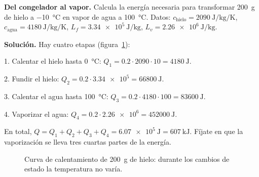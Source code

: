 \begin{example}
    \textbf{Del congelador al vapor.} Calcula la energía necesaria para transformar \qty{200}{\g} de hielo a \qty{-10}{\degreeCelsius}
    en vapor de agua a \qty{100}{\degreeCelsius}. Datos: \(c_{\text{hielo}} = \qty{2090}{\joule\per\kg\per\kelvin}\),
    \(c_{\text{agua}} = \qty{4180}{\joule\per\kg\per\kelvin}\), \(L_f = \qty{3.34e5}{\joule\per\kg}\), \(L_v = \qty{2.26e6}{\joule\per\kg}\).

    \textbf{Solución.} Hay cuatro etapas (figura~\ref{fig:ud13-calentamiento}):

    1. Calentar el hielo hasta \qty{0}{\degreeCelsius}: \(Q_1 = \num{0.2} \cdot 2090 \cdot 10 = \qty{4180}{\joule}\).

    2. Fundir el hielo: \(Q_2 = \num{0.2} \cdot \num{3.34e5} = \qty{66800}{\joule}\).

    3. Calentar el agua hasta \qty{100}{\degreeCelsius}: \(Q_3 = \num{0.2} \cdot 4180 \cdot 100 = \qty{83600}{\joule}\).

    4. Vaporizar el agua: \(Q_4 = \num{0.2} \cdot \num{2.26e6} = \qty{452000}{\joule}\).

    En total, \(Q = Q_1 + Q_2 + Q_3 + Q_4 = \qty{6.07e5}{\joule} = \qty{607}{\kilo\joule}\). Fíjate en que la vaporización se lleva
    tres cuartas partes de la energía.
\end{example}

\begin{figure}[H]
    \centering
    \caption{Curva de calentamiento de \qty{200}{\g} de hielo: durante los cambios de estado la temperatura no varía.}
    \label{fig:ud13-calentamiento}
\end{figure}

